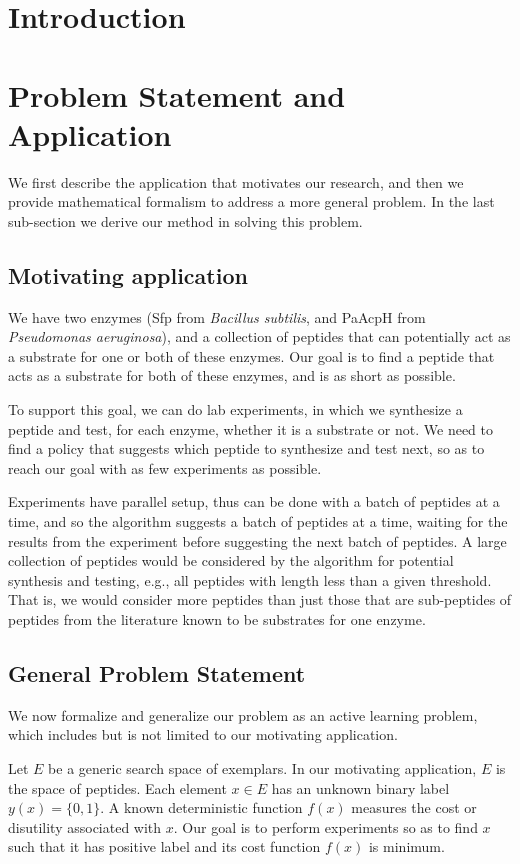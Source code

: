 \documentclass[12pt]{article}
\begin{document}
\section{Introduction}

\section{Problem Statement and Application}
We first describe the application that motivates our research, and then we provide mathematical formalism to address a more general problem. In the last sub-section we derive our method in solving this problem.

\subsection{Motivating application}
We have two enzymes (Sfp from {\it Bacillus subtilis}, and PaAcpH from {\it Pseudomonas aeruginosa}), and a collection of peptides that can potentially act as a substrate for one or both of these enzymes.  Our goal is to find a peptide that acts as a substrate for both of these enzymes, and is as short as possible.

To support this goal, we can do lab experiments, in which we synthesize a peptide and test, for each enzyme, whether it is a substrate or not.  We need to find a policy that suggests which peptide to synthesize and test next, so as to reach our goal with as few experiments as possible.

Experiments have parallel setup, thus can be done with a batch of peptides at a time, and so the algorithm suggests a batch of peptides at a time, waiting for the results from the experiment before suggesting the next batch of peptides.
A large collection of peptides would be considered by the algorithm for potential synthesis and testing, e.g., all peptides with length less than a given threshold.  That is, we would consider more peptides than just those that are sub-peptides of peptides from the literature known to be substrates for one enzyme.

\subsection{General Problem Statement}
We now formalize and generalize our problem as an active learning problem, which includes but is not limited to our motivating application.

Let $E$ be a generic search space of exemplars.  In our motivating application, $E$ is the space of peptides.
Each element $x \in E$ has an unknown binary label $y(x)=\{0,1\}$.  A known deterministic function $f(x)$ measures the cost or disutility associated with $x$. Our goal is to perform experiments so as to find $x$ such that it has positive label and its cost function $f(x)$ is minimum.
\end{document}
